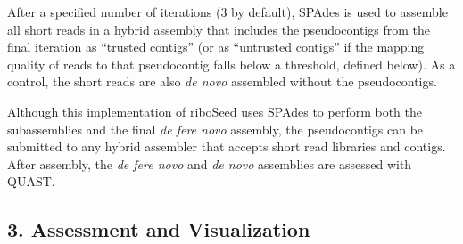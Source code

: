 \documentclass[a4,center,fleqn]{NAR}
\begin{document}
After a specified number of iterations (3 by default), SPAdes is used to assemble all short reads in a hybrid assembly that includes the pseudocontigs from the final iteration as ``trusted contigs'' (or as ``untrusted contigs'' if the mapping quality of reads to that pseudocontig falls below a threshold, defined below). As a control, the short reads are also \textit{de novo} assembled without the pseudocontigs.


Although this implementation of riboSeed uses SPAdes to perform both the subassemblies and the final \textit{de fere novo} assembly, the pseudocontigs can be submitted to any hybrid assembler that accepts short read libraries and contigs. After assembly, the \textit{de fere novo} and \textit{de novo} assemblies are assessed with QUAST\cite{Gurevich2013}.


\subsection*{3. Assessment and Visualization}
\end{document}
